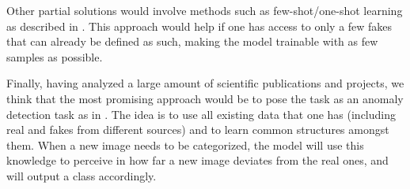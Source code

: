 \documentclass[11pt]{article}
\begin{document}
Other partial solutions would involve methods such as few-shot/one-shot learning as described in \cite{Aneja2020,Cozzolino2018}. This approach would help if one has access to only a few fakes that can already be defined as such, making the model trainable with as few samples as possible.

Finally, having analyzed a large amount of scientific publications and projects, we think that the most promising approach would be to pose the task as an anomaly detection task as in \cite{anomalyPaper}. The idea is to use all existing data that one has (including real and fakes from different sources) and to learn common structures amongst them. When a new image needs to be categorized, the model will use this knowledge to perceive in how far a new image deviates from the real ones, and will output a class accordingly.





\end{document}

